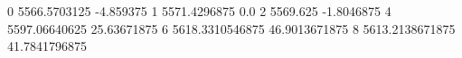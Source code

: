0 5566.5703125 -4.859375
1 5571.4296875 0.0
2 5569.625 -1.8046875
4 5597.06640625 25.63671875
6 5618.3310546875 46.9013671875
8 5613.2138671875 41.7841796875
